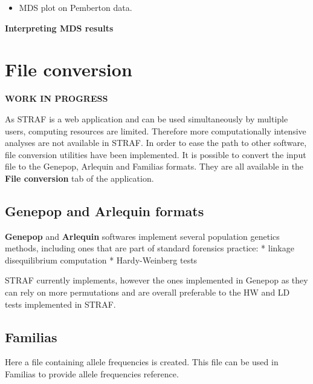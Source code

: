 \documentclass[
  a5paper]{book}
\providecommand{\tightlist}{%
  \setlength{\itemsep}{0pt}\setlength{\parskip}{0pt}}
\begin{document}
\begin{itemize}
\tightlist
\item
  MDS plot on Pemberton data.
\end{itemize}

\textbf{Interpreting MDS results}

\hypertarget{file-conversion}{%
\chapter{File conversion}\label{file-conversion}}

\textbf{WORK IN PROGRESS}

As STRAF is a web application and can be used simultaneously by multiple users,
computing resources are limited. Therefore more computationally intensive analyses
are not available in STRAF. In order to ease the path to other software,
file conversion utilities have been implemented. It is possible to convert
the input file to the Genepop, Arlequin and Familias formats. They are
all available in the \textbf{File conversion} tab of the application.

\hypertarget{genepop-and-arlequin-formats}{%
\section{Genepop and Arlequin formats}\label{genepop-and-arlequin-formats}}

\textbf{Genepop} and \textbf{Arlequin} softwares implement several population genetics methods,
including ones that are part of standard forensics practice:
* linkage disequilibrium computation
* Hardy-Weinberg tests

STRAF currently implements, however the ones implemented in Genepop as they can
rely on more permutations and are overall preferable to the HW and LD tests implemented
in STRAF.

\hypertarget{familias}{%
\section{Familias}\label{familias}}

Here a file containing allele frequencies is created. This file can be used in
Familias to provide allele frequencies reference.
\end{document}
